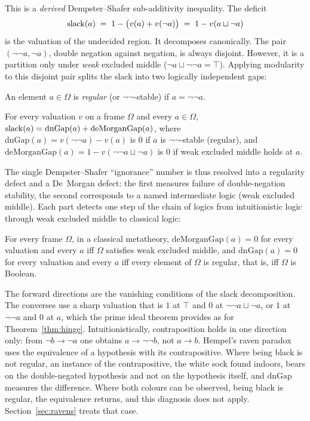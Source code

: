\noindent
This is a \emph{derived} Dempster--Shafer sub-additivity inequality.
The deficit
\[
  \mathrm{slack}(a) \;=\; 1 - \bigl(v(a) + v(\neg a)\bigr)
  \;=\; 1 - v(a \sqcup \neg a)
\]
is the valuation of the undecided region.  It decomposes canonically.
The pair $(\neg\neg a, \neg a)$, double negation
against negation, is always disjoint. However, it is a partition only under
\emph{weak} excluded middle
($\neg a \sqcup \neg\neg a = \top$).
Applying modularity to this disjoint pair splits
the slack into two logically independent gaps:

\begin{definition}
An element $a \in \Omega$ is \emph{regular} (or $\neg\neg$-stable) if
$a = \neg\neg a$.
\end{definition}

\begin{theorem}
For every valuation $v$ on a frame $\Omega$ and every $a \in \Omega$,
$\mathrm{slack}(a) = \mathrm{dnGap}(a) + \mathrm{deMorganGap}(a)$, where
$\mathrm{dnGap}(a) = v(\neg\neg a) - v(a)$ is $0$ if $a$ is
$\neg\neg$-stable (regular), and
$\mathrm{deMorganGap}(a) = 1 - v(\neg\neg a \sqcup \neg a)$
is $0$ if weak excluded middle holds at $a$.
\end{theorem}

\noindent
The single Dempster--Shafer ``ignorance'' number is thus resolved
into a regularity defect and a De~Morgan defect: the first measures
failure of double-negation stability, the second corresponds to a
named intermediate logic (weak excluded middle).  Each part detects one
step of the chain of logics from intuitionistic logic through weak
excluded middle to classical logic:

\begin{theorem}
\label{thm:slack-logics}
For every frame $\Omega$, in a classical metatheory,
$\mathrm{deMorganGap}(a) = 0$ for every valuation and every $a$ iff
$\Omega$ satisfies weak excluded middle, and $\mathrm{dnGap}(a) = 0$ for
every valuation and every $a$ iff every element of $\Omega$ is regular,
that is, iff $\Omega$ is Boolean.
\end{theorem}

\noindent
The forward directions are the vanishing conditions of the slack
decomposition. The converses use a sharp valuation that is $1$ at $\top$
and $0$ at $\neg\neg a \sqcup \neg a$, or $1$ at $\neg\neg a$ and $0$ at
$a$, which the prime ideal theorem provides as for
Theorem~\ref{thm:hinge}. 
Intuitionistically, contraposition holds in one direction only: from
$\neg b \to \neg a$ one obtains $a \to \neg\neg b$, not $a \to b$.
Hempel's raven paradox~\cite{hempel1945} uses the equivalence of a
hypothesis with its contrapositive. Where being black is not regular, an
instance of the contrapositive, the white sock found indoors, bears on
the double-negated hypothesis and not on the hypothesis itself, and
$\mathrm{dnGap}$ measures the difference. Where both colours can be
observed, being black is regular, the equivalence returns, and this
diagnosis does not apply. Section~\ref{sec:ravens} treats that case.

